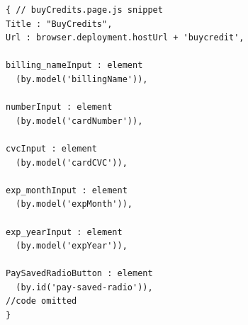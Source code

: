 \begin{minipage}{.48\textwidth}
\begin{listing}[H]
\begin{verbatim}
{ // buyCredits.page.js snippet
Title : "BuyCredits",
Url : browser.deployment.hostUrl + 'buycredit',

billing_nameInput : element
  (by.model('billingName')),

numberInput : element
  (by.model('cardNumber')),

cvcInput : element
  (by.model('cardCVC')),

exp_monthInput : element
  (by.model('expMonth')),

exp_yearInput : element
  (by.model('expYear')),

PaySavedRadioButton : element
  (by.id('pay-saved-radio')),
//code omitted
}
\end{verbatim}
\label{lst:buycredits-page-code}
\end{listing}
\vspace{0.1cm}
\end{minipage}%
